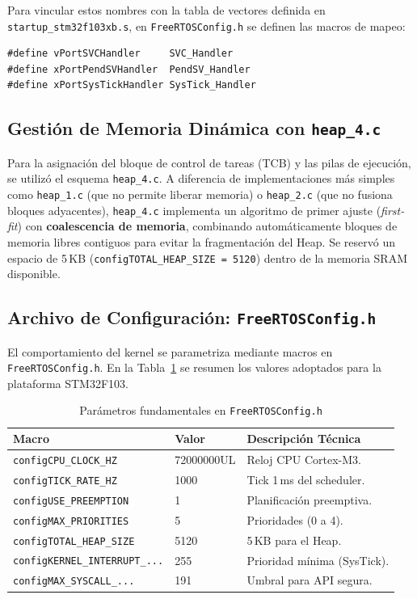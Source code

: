 \documentclass{plantilla}
\begin{document}
Para vincular estos nombres con la tabla de vectores definida en \texttt{startup\_stm32f103xb.s}, en \texttt{FreeRTOSConfig.h} se definen las macros de mapeo:
\begin{lstlisting}
#define vPortSVCHandler     SVC_Handler
#define xPortPendSVHandler  PendSV_Handler
#define xPortSysTickHandler SysTick_Handler
\end{lstlisting}

\subsection{Gestión de Memoria Dinámica con \texttt{heap\_4.c}}
Para la asignación del bloque de control de tareas (TCB) y las pilas de ejecución, se utilizó el esquema \texttt{heap\_4.c}. A diferencia de implementaciones más simples como \texttt{heap\_1.c} (que no permite liberar memoria) o \texttt{heap\_2.c} (que no fusiona bloques adyacentes), \texttt{heap\_4.c} implementa un algoritmo de primer ajuste (\textit{first-fit}) con \textbf{coalescencia de memoria}, combinando automáticamente bloques de memoria libres contiguos para evitar la fragmentación del Heap. Se reservó un espacio de 5\,KB (\texttt{configTOTAL\_HEAP\_SIZE = 5120}) dentro de la memoria SRAM disponible.

\subsection{Archivo de Configuración: \texttt{FreeRTOSConfig.h}}
El comportamiento del kernel se parametriza mediante macros en \texttt{FreeRTOSConfig.h}. En la Tabla~\ref{tab_config} se resumen los valores adoptados para la plataforma STM32F103.

\begin{table}[H]
\centering
\caption{Parámetros fundamentales en \texttt{FreeRTOSConfig.h}}
\label{tab_config}
\scriptsize
\begin{tabular}{@{}llp{2.8cm}@{}}
\toprule
\textbf{Macro} & \textbf{Valor} & \textbf{Descripción Técnica} \\
\midrule
\texttt{configCPU\_CLOCK\_HZ} & 72000000UL & Reloj CPU Cortex-M3. \\
\texttt{configTICK\_RATE\_HZ} & 1000 & Tick 1\,ms del scheduler. \\
\texttt{configUSE\_PREEMPTION} & 1 & Planificación preemptiva. \\
\texttt{configMAX\_PRIORITIES} & 5 & Prioridades (0 a 4). \\
\texttt{configTOTAL\_HEAP\_SIZE} & 5120 & 5\,KB para el Heap. \\
\texttt{configKERNEL\_INTERRUPT\_...} & 255 & Prioridad mínima (SysTick). \\
\texttt{configMAX\_SYSCALL\_...} & 191 & Umbral para API segura. \\
\bottomrule
\end{tabular}
\end{table}
\end{document}
